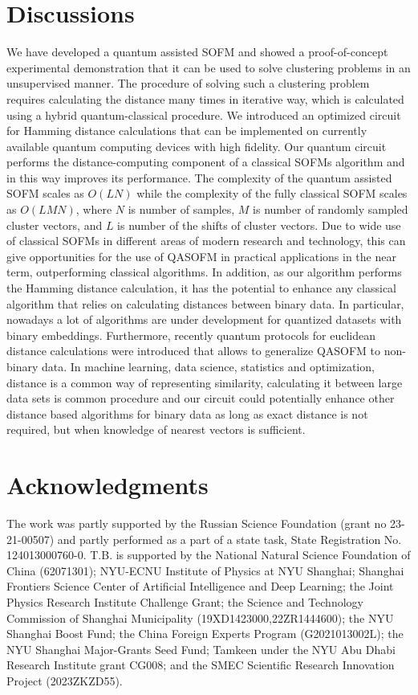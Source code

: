 \documentclass[pra,showkeys,twocolumn,showpacs,aps,10pt]{revtex4-1}
\begin{document}
\section{Discussions}
We have developed a quantum assisted SOFM and showed a proof-of-concept experimental demonstration
that it can be used to solve clustering problems in an unsupervised manner.
The procedure of solving such a clustering problem requires calculating the distance many times in iterative way,
which is calculated using a hybrid quantum-classical procedure.
We introduced an optimized circuit for Hamming distance calculations that can be implemented on currently available quantum computing devices with high fidelity.
Our quantum circuit performs the distance-computing component of a classical SOFMs algorithm
and in this way improves its performance.
The complexity of the quantum assisted SOFM scales as $O(LN)$
while the complexity of the fully classical SOFM scales as $O(LMN)$,
where $N$ is number of samples, $M$ is number of randomly sampled cluster vectors,
and $L$ is number of the shifts of cluster vectors.
Due to wide use of classical SOFMs in different areas of modern research and technology,
this can give opportunities for the use of QASOFM in practical applications in the near term, outperforming classical algorithms.
In addition, as our algorithm performs the Hamming distance calculation,
it has the potential to enhance any classical algorithm that relies on calculating distances between binary data. In particular, nowadays a lot of algorithms are under development for quantized datasets with binary embeddings\cite{zhuangFastTrainingTripletBased2016,yiBinaryEmbeddingFundamental2015,AsymmetricDistancesBinary}. Furthermore, recently quantum protocols for euclidean distance calculations were introduced\cite{yuQuantumAlgorithmsSimilarity2020,zardiniQuantumKnearestNeighbors2024} that allows to generalize QASOFM to non-binary data. In machine learning, data science, statistics and optimization, distance is a common way of representing similarity, calculating it between large data sets is common procedure
and our circuit could potentially enhance other distance based algorithms for binary data  as long as exact distance is not required,
but when knowledge of nearest vectors is sufficient.



\section*{Acknowledgments}
The work was partly supported by the
Russian Science Foundation (grant no 23-21-00507) and partly performed as a part of a state task, State Registration No. 124013000760-0.
T.B. is supported by the National Natural Science Foundation of China (62071301);
NYU-ECNU Institute of Physics at NYU Shanghai;
Shanghai Frontiers Science Center of Artificial Intelligence and Deep Learning;
the Joint Physics Research Institute Challenge Grant;
the Science and Technology Commission of Shanghai Municipality (19XD1423000,22ZR1444600);
the NYU Shanghai Boost Fund; the China Foreign Experts Program (G2021013002L);
the NYU Shanghai Major-Grants Seed Fund; Tamkeen under the NYU Abu Dhabi Research Institute grant CG008;
and the SMEC Scientific Research Innovation Project (2023ZKZD55).
\end{document}
